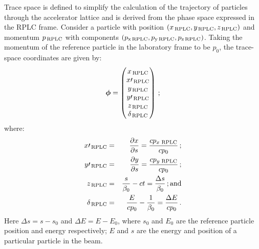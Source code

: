 Trace space is defined to simplify the calculation of the trajectory
of particles through the accelerator lattice and is derived from the
phase space expressed in the RPLC frame.
Consider a particle with position
$(x_{\rm\,RPLC}, y_{\rm\,RPLC}, z_{\rm\,RPLC})$ and momentum 
$p_{\rm\,RPLC}$ with components
$(p_{\rm x\,RPLC}, p_{\rm y\,RPLC}, p_{\rm z\,RPLC})$.
Taking the momentum of the reference particle in the laboratory frame
to be $p_0$, the trace-space coordinates are given by:
\begin{equation}
    \bm{\phi} = \begin{pmatrix}
                  x_{\rm\,RPLC}       \\
                  x\prime_{\rm\,RPLC} \\
                  y_{\rm\,RPLC}       \\
                  y\prime_{\rm\,RPLC} \\
                  z_{\rm\,RPLC}       \\
                  \delta_{\rm\,RPLC}
                \end{pmatrix} \, ;
\end{equation}
where:
\begin{eqnarray}
  x\prime_{\rm\,RPLC}  & = & \frac{\partial x}{\partial s} = \frac{cp_{x\,{\rm\,RPLC}}}{cp_0} \, ; \\
  y\prime_{\rm\,RPLC}  & = & \frac{\partial y}{\partial s} = \frac{cp_{y\,{\rm\,RPLC}}}{cp_0} \, ; \\
  z_{\rm\,RPLC}        & = & \frac{s}{\beta_0} - ct = \frac{\Delta s}{\beta_0}                    \, {\rm ; and} \\
  \delta_{\rm\,RPLC}   & = & \frac{E}{c p_0} - \frac{1}{\beta_0} = \frac{\Delta E}{cp_0}          \, .    
\end{eqnarray}
Here $\Delta s = s - s_0$ and $\Delta E = E - E_0$, where $s_0$ and
$E_0$ are the reference particle position and energy respectively; $E$
and $s$ are the energy and position of a particular particle in the
beam.
